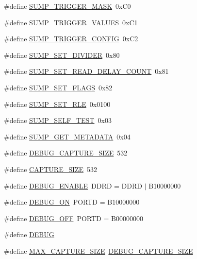 \begin{DoxyCompactItemize}
\#define \hyperlink{logic__analyzer_8ino_a523d086cb4b909898dd1f7aabc71a836}{S\-U\-M\-P\-\_\-\-T\-R\-I\-G\-G\-E\-R\-\_\-\-M\-A\-S\-K}~0x\-C0
\item 
\#define \hyperlink{logic__analyzer_8ino_a50b766258caa228c7af1aa6cdfda02bb}{S\-U\-M\-P\-\_\-\-T\-R\-I\-G\-G\-E\-R\-\_\-\-V\-A\-L\-U\-E\-S}~0x\-C1
\item 
\#define \hyperlink{logic__analyzer_8ino_acbc9f97580617610a957323e91e54a51}{S\-U\-M\-P\-\_\-\-T\-R\-I\-G\-G\-E\-R\-\_\-\-C\-O\-N\-F\-I\-G}~0x\-C2
\item 
\#define \hyperlink{logic__analyzer_8ino_ae614f1af0becbc173afcd0185d44db9d}{S\-U\-M\-P\-\_\-\-S\-E\-T\-\_\-\-D\-I\-V\-I\-D\-E\-R}~0x80
\item 
\#define \hyperlink{logic__analyzer_8ino_a4ff39e8391460471f79c706719214208}{S\-U\-M\-P\-\_\-\-S\-E\-T\-\_\-\-R\-E\-A\-D\-\_\-\-D\-E\-L\-A\-Y\-\_\-\-C\-O\-U\-N\-T}~0x81
\item 
\#define \hyperlink{logic__analyzer_8ino_af8f32d4a870cddb2ea4f6288aafee5f9}{S\-U\-M\-P\-\_\-\-S\-E\-T\-\_\-\-F\-L\-A\-G\-S}~0x82
\item 
\#define \hyperlink{logic__analyzer_8ino_aba2ea2e26e8a124b9f70a588af50db9f}{S\-U\-M\-P\-\_\-\-S\-E\-T\-\_\-\-R\-L\-E}~0x0100
\item 
\#define \hyperlink{logic__analyzer_8ino_a35bb9f380cc507c96a51dfc66c523862}{S\-U\-M\-P\-\_\-\-S\-E\-L\-F\-\_\-\-T\-E\-S\-T}~0x03
\item 
\#define \hyperlink{logic__analyzer_8ino_a050fdc557a56366251873b1d4fc02463}{S\-U\-M\-P\-\_\-\-G\-E\-T\-\_\-\-M\-E\-T\-A\-D\-A\-T\-A}~0x04
\item 
\#define \hyperlink{logic__analyzer_8ino_a802972ed06c1b471eadf0f7f354730a7}{D\-E\-B\-U\-G\-\_\-\-C\-A\-P\-T\-U\-R\-E\-\_\-\-S\-I\-Z\-E}~532
\item 
\#define \hyperlink{logic__analyzer_8ino_a43bdfbb41785365ed1f79b6f6ce56c8e}{C\-A\-P\-T\-U\-R\-E\-\_\-\-S\-I\-Z\-E}~532
\item 
\#define \hyperlink{logic__analyzer_8ino_a92f1452fef4b184124fa2334beb53a60}{D\-E\-B\-U\-G\-\_\-\-E\-N\-A\-B\-L\-E}~D\-D\-R\-D = D\-D\-R\-D $\vert$ B10000000
\item 
\#define \hyperlink{logic__analyzer_8ino_a911d91f7898a9a0c4e35bb71e01d39a0}{D\-E\-B\-U\-G\-\_\-\-O\-N}~P\-O\-R\-T\-D = B10000000
\item 
\#define \hyperlink{logic__analyzer_8ino_afff2c6be67c226eb2b1359a3cd2042b2}{D\-E\-B\-U\-G\-\_\-\-O\-F\-F}~P\-O\-R\-T\-D = B00000000
\item 
\#define \hyperlink{logic__analyzer_8ino_ad72dbcf6d0153db1b8d8a58001feed83}{D\-E\-B\-U\-G}
\item 
\#define \hyperlink{logic__analyzer_8ino_a9fc5489cac12001b6bd8f4327f19d8d3}{M\-A\-X\-\_\-\-C\-A\-P\-T\-U\-R\-E\-\_\-\-S\-I\-Z\-E}~\hyperlink{logic__analyzer_8ino_a802972ed06c1b471eadf0f7f354730a7}{D\-E\-B\-U\-G\-\_\-\-C\-A\-P\-T\-U\-R\-E\-\_\-\-S\-I\-Z\-E}
\end{DoxyCompactItemize}
